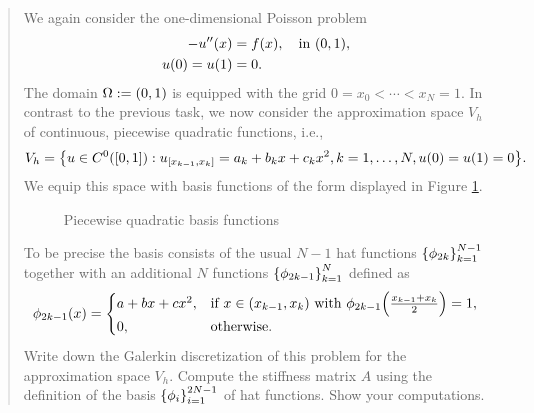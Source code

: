 \documentclass[english]{exercise}
\begin{document}
    \begin{quote}
        We again consider the one-dimensional Poisson problem
        \begin{align*}
            -u''\parentheses*{x} &= f\parentheses*{x}, \quad \text{in }\parentheses*{0, 1},\\
            u\parentheses*{0} = u\parentheses*{1} &= 0.
        \end{align*}
        The domain \(\Omega := \parentheses*{0, 1}\) is equipped with the grid \(0 = x_0 < \cdots < x_N = 1\).
        In contrast to the previous task, we now consider the approximation space \(V_h\) of continuous, piecewise quadratic functions, i.e.,
        \[
            V_h = \braces*{u \in C^0\parentheses*{\brackets*{0, 1}} : u_{\brackets*{x_{k - 1}, x_k}} = a_k + b_k x + c_k x^2, k = 1, \ldots, N, u\parentheses*{0} = u\parentheses*{1} = 0}.
        \]
        We equip this space with basis functions of the form displayed in Figure \ref{fig:2-1}.
        \begin{figure}[ht]
            \centering
            \caption{Piecewise quadratic basis functions}
            \label{fig:2-1}
        \end{figure}
        To be precise the basis consists of the usual \(N - 1\) hat functions \(\braces*{\phi_{2k}}_{k = 1}^{N - 1}\) together with an additional \(N\) functions \(\braces*{\phi_{2k - 1}}_{k = 1}^N\) defined as
        \[
            \phi_{2k - 1}\parentheses*{x} = \begin{cases}
                a + bx + cx^2, & \text{if }x \in \parentheses*{x_{k - 1}, x_k}\text{ with }\phi_{2k - 1}\parentheses*{\frac{x_{k - 1} + x_k}{2}} = 1,\\
                0, & \text{otherwise}.
            \end{cases}
        \]
        Write down the Galerkin discretization of this problem for the approximation space \(V_h\).
        Compute the stiffness matrix \(A\) using the definition of the basis \(\braces*{\phi_i}_{i = 1}^{2N - 1}\) of hat functions.
        Show your computations.
    \end{quote}
\end{document}
